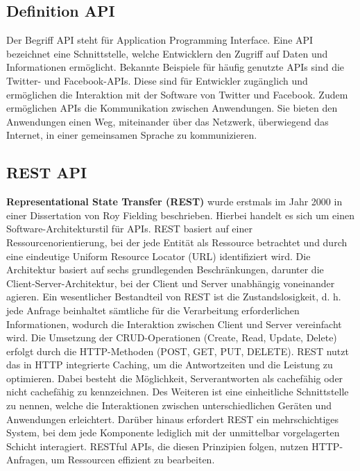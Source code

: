 \subsection{Definition API} %
\label{sec:grundlegendedefinitionvonapi}
Der Begriff \glqq API\grqq{}  steht für \glqq Application Programming Interface\grqq{}. Eine API bezeichnet eine Schnittstelle, welche Entwicklern den Zugriff auf Daten und Informationen ermöglicht. Bekannte Beispiele für häufig genutzte APIs sind die Twitter- und Facebook-APIs. Diese sind für Entwickler zugänglich und ermöglichen die Interaktion mit der Software von Twitter und Facebook. Zudem ermöglichen APIs die Kommunikation zwischen Anwendungen. Sie bieten den Anwendungen einen Weg, miteinander über das Netzwerk, überwiegend das Internet, in einer gemeinsamen Sprache zu kommunizieren. \citep{apistrategyguide}
\subsection{REST API} %
\label{sec:restapi}
 \textbf{Representational State Transfer (REST)} wurde erstmals im Jahr 2000 in einer Dissertation von Roy Fielding beschrieben. Hierbei handelt es sich um einen Software-Architekturstil für APIs. REST basiert auf einer Ressourcenorientierung, bei der jede Entität als Ressource betrachtet und durch eine eindeutige Uniform Resource Locator (URL) identifiziert wird. Die Architektur basiert auf sechs grundlegenden Beschränkungen, darunter die Client-Server-Architektur, bei der Client und Server unabhängig voneinander agieren. Ein wesentlicher Bestandteil von REST ist die Zustandslosigkeit, d. h. jede Anfrage beinhaltet sämtliche für die Verarbeitung erforderlichen Informationen, wodurch die Interaktion zwischen Client und Server vereinfacht wird. Die Umsetzung der CRUD-Operationen (Create, Read, Update, Delete) erfolgt durch die HTTP-Methoden (POST, GET, PUT, DELETE). REST nutzt das in HTTP integrierte Caching, um die Antwortzeiten und die Leistung zu optimieren. Dabei besteht die Möglichkeit, Serverantworten als cachefähig oder nicht cachefähig zu kennzeichnen. Des Weiteren ist eine einheitliche Schnittstelle zu nennen, welche die Interaktionen zwischen unterschiedlichen Geräten und Anwendungen erleichtert. Darüber hinaus erfordert REST ein mehrschichtiges System, bei dem jede Komponente lediglich mit der unmittelbar vorgelagerten Schicht interagiert. RESTful APIs, die diesen Prinzipien folgen, nutzen HTTP-Anfragen, um Ressourcen effizient zu bearbeiten. \citep{Fielding2000}  \citep{graphqlreplacerest}
